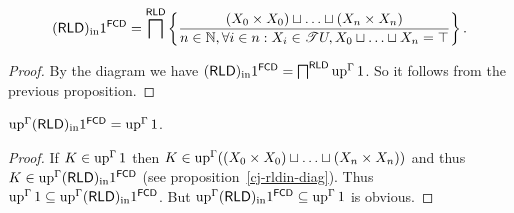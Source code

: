 \begin{prop}
  ~
  \[ (\mathsf{RLD})_{\mathrm{in}} 1^{\mathsf{FCD}} =
     \bigsqcap^{\mathsf{RLD}} \left\{ \frac{ (X_0 \times X_0) \sqcup \ldots
     \sqcup (X_n \times X_n) }{ n \in \mathbb{N},
     \forall i \in n : X_i \in \mathscr{T} U, X_0 \sqcup \ldots \sqcup X_n =
     \top }\right\} . \]
\end{prop}

\begin{proof}
  By the diagram we have $(\mathsf{RLD})_{\mathrm{in}}
  1^{\mathsf{FCD}} = \bigsqcap^{\mathsf{RLD}} \operatorname{up}^{\Gamma} 1$. So it follows from the previous proposition.
\end{proof}

\begin{prop}
  $\operatorname{up}^{\Gamma} (\mathsf{RLD})_{\mathrm{in}} 1^{\mathsf{FCD}} = \operatorname{up}^{\Gamma} 1$.
\end{prop}

\begin{proof}
  If $K \in \operatorname{up}^{\Gamma} 1$ then $K \in \operatorname{up}^{\Gamma} ((X_0 \times
  X_0) \sqcup \ldots \sqcup (X_n \times X_n))$ and thus $K \in
  \operatorname{up}^{\Gamma}  (\mathsf{RLD})_{\mathrm{in}}
  1^{\mathsf{FCD}}$ (see proposition~\ref{cj-rldin-diag}). Thus $\operatorname{up}^{\Gamma}
  1 \subseteq \operatorname{up}^{\Gamma}  (\mathsf{RLD})_{\mathrm{in}}
  1^{\mathsf{FCD}}$. But $\operatorname{up}^{\Gamma} 
  (\mathsf{RLD})_{\mathrm{in}} 1^{\mathsf{FCD}} \subseteq
  \operatorname{up}^{\Gamma} 1$ is obvious.
\end{proof}
